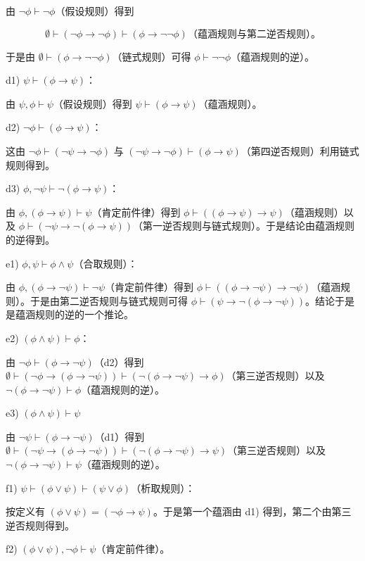 由  $ \neg\phi \vdash \neg\phi $（假设规则）得到

\[
\emptyset\vdash(\neg\phi\rightarrow\neg\phi)\vdash(\phi\rightarrow\neg\neg\phi)\text{（蕴涵规则与第二逆否规则）。}
\]

于是由  $ \emptyset \vdash (\phi \to \neg \neg \phi) $（链式规则）可得  $ \phi \vdash \neg \neg \phi $（蕴涵规则的逆）。

d1)  $ \psi \vdash (\phi \rightarrow \psi) $：

由 $\psi, \phi \vdash \psi$（假设规则）得到 $\psi \vdash (\phi \to \psi)$（蕴涵规则）。

d2)  $ \neg \phi \vdash (\phi \rightarrow \psi) $：

这由 $\neg\phi\vdash(\neg\psi\rightarrow\neg\phi)$ 与 $(\neg\psi\rightarrow\neg\phi)\vdash(\phi\rightarrow\psi)$（第四逆否规则）利用链式规则得到。

d3)  $ \phi, \neg\psi \vdash \neg(\phi \rightarrow \psi) $：

由 $\phi, (\phi \to \psi) \vdash \psi$（肯定前件律）得到 $\phi \vdash ((\phi \to \psi) \to \psi)$（蕴涵规则）以及 $\phi \vdash (\neg \psi \to \neg (\phi \to \psi))$（第一逆否规则与链式规则）。于是结论由蕴涵规则的逆得到。

e1)  $ \phi, \psi \vdash \phi \land \psi $（合取规则）：

由 $\phi, (\phi \to \neg\psi) \vdash \neg\psi$（肯定前件律）得到 $\phi \vdash ((\phi \to \neg\psi) \to \neg\psi)$（蕴涵规则）。于是由第二逆否规则与链式规则可得 $\phi \vdash (\psi \to \neg(\phi \to \neg\psi))$。结论于是是蕴涵规则的逆的一个推论。

e2)  $ (\phi \land \psi) \vdash \phi $：

由 $\neg\phi\vdash(\phi\to\neg\psi)$（d2）得到 $\emptyset\vdash(\neg\phi\to(\phi\to\neg\psi))\vdash(\neg(\phi\to\neg\psi)\to\phi)$（第三逆否规则）以及 $\neg(\phi\to\neg\psi)\vdash\phi$（蕴涵规则的逆）。

e3)  $ (\phi \land \psi) \vdash \psi $

由 $\neg\psi \vdash (\phi \to \neg\psi)$（d1）得到 $\emptyset \vdash (\neg\psi \to (\phi \to \neg\psi)) \vdash (\neg(\phi \to \neg\psi) \to \psi)$（第三逆否规则）以及 $\neg(\phi \to \neg\psi) \vdash \psi$（蕴涵规则的逆）。

f1)  $ \psi \vdash (\phi \lor \psi) \vdash (\psi \lor \phi) $（析取规则）：

按定义有  $ (\phi \lor \psi) = (\neg \phi \to \psi) $。于是第一个蕴涵由 d1) 得到，第二个由第三逆否规则得到。

f2)  $ (\phi \lor \psi), \neg \phi \vdash \psi $（肯定前件律）。

